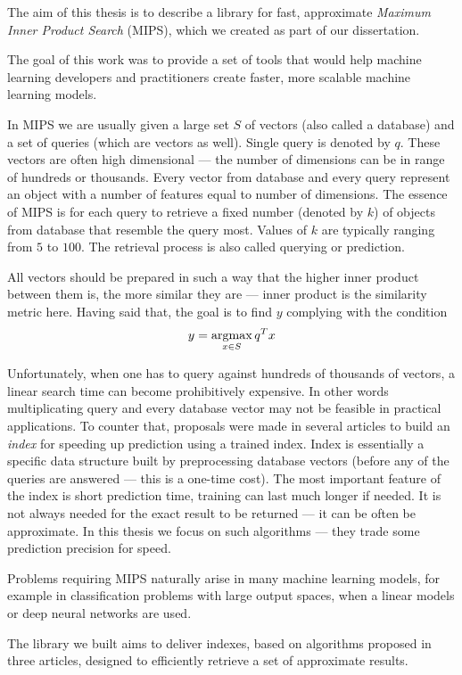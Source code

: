 The aim of this thesis is to describe a library for fast, approximate \textit{Maximum Inner Product Search} (MIPS),
which we created as part of our dissertation. 

The goal of this work was to provide a set of tools that would help machine learning developers and practitioners create faster, 
more scalable machine learning models.

In MIPS we are usually given a large set $S$ of vectors (also called a database) and a set of queries
(which are vectors as well). Single query is denoted by $q$.
These vectors are often high dimensional --- the number of dimensions can be in range of hundreds or thousands.
Every vector from database and every query represent an object with a number of features equal to number of dimensions.
The essence of MIPS is for each query to retrieve a fixed number (denoted by $k$)
of objects from database that resemble the query most.
Values of $k$ are typically ranging from $5$ to $100$.
The retrieval process is also called querying or prediction.

All vectors should be prepared in such a way that the higher inner product between them is, the more similar they are
 --- inner product is the similarity metric here. Having said that, the goal is to find $y$ complying with the condition
\[ y = \operatorname*{argmax}_{x \in S} q^T x \]

Unfortunately, when one has to query against hundreds of thousands of vectors,
a linear search time can become prohibitively expensive.
In other words multiplicating query and every database vector may not be feasible in practical applications.
To counter that, proposals were made in several articles to build an \textit{index} for speeding
up prediction using a trained index.
Index is essentially a specific data structure built by preprocessing database vectors (before
any of the queries are answered --- this is a one-time cost).
The most important feature of the index is short prediction time, training can last much longer if needed.
It is not always needed for the exact result to be returned --- it can be often be approximate.
In this thesis we focus on such algorithms --- they trade some prediction precision for speed.

Problems requiring MIPS naturally arise in many machine learning models, for example in
classification problems with large output spaces, when a linear models or deep neural networks are used.

The library we built aims to deliver indexes, based on algorithms proposed in three articles,
designed to efficiently retrieve a set of approximate results.

